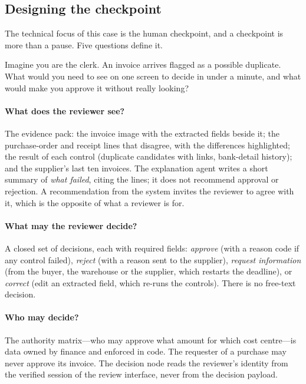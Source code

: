 \subsection{Designing the checkpoint}

The technical focus of this case is the human checkpoint, and a checkpoint is more than a pause. Five questions define it.

\begin{thinkabout}
Imagine you are the clerk. An invoice arrives flagged as a possible duplicate. What would you need to see on one screen to decide in under a minute, and what would make you approve it without really looking?
\end{thinkabout}

\paragraph{What does the reviewer see?} The evidence pack: the invoice image with the extracted fields beside it; the purchase-order and receipt lines that disagree, with the differences highlighted; the result of each control (duplicate candidates with links, bank-detail history); and the supplier's last ten invoices. The explanation agent writes a short summary of \emph{what failed}, citing the lines; it does not recommend approval or rejection. A recommendation from the system invites the reviewer to agree with it, which is the opposite of what a reviewer is for.

\paragraph{What may the reviewer decide?} A closed set of decisions, each with required fields: \emph{approve} (with a reason code if any control failed), \emph{reject} (with a reason sent to the supplier), \emph{request information} (from the buyer, the warehouse or the supplier, which restarts the deadline), or \emph{correct} (edit an extracted field, which re-runs the controls). There is no free-text decision.

\paragraph{Who may decide?} The authority matrix---who may approve what amount for which cost centre---is data owned by finance and enforced in code. The requester of a purchase may never approve its invoice. The decision node reads the reviewer's identity from the verified session of the review interface, never from the decision payload.

